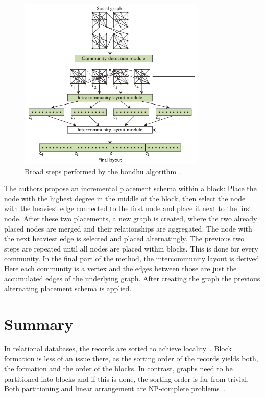     \begin{figure}[htp]
        \begin{center}
            \includegraphics[keepaspectratio,width=0.8\textwidth]{img/06-rel_w/bondhu.png}
        \end{center}
        \caption{Broad steps performed by the bondhu algorithm~\autocite{hoque2012disk}.} 
        \label{bondhu-fig}
    \end{figure}

    The authors propose an incremental placement schema within a block:
    Place the node with the highest degree in the middle of the block, then select the node with the heaviest edge connected to the first node and place it next to the first node. 
    After these two placements, a new graph is created, where the two already placed nodes are merged and their relationships are aggregated. 
    The node with the next heaviest edge is selected and placed alternatingly. The previous two steps are repeated until all nodes are placed within blocks.
    This is done for every community.
    In the final part of the method, the intercommunity layout is derived. 
    Here each community is a vertex and the edges between those are just the accumulated edges of the underlying graph. 
    After creating the graph the previous alternating placement schema is applied.
    
    
\section*{Summary}
    In relational databases, the records are sorted to achieve locality~\autocite{ramakrishnan2000database, silberschatz1997database}. 
    Block formation is less of an issue there, as the sorting order of the records yields both, the formation and the order of the blocks.
    In contrast, graphs need to be partitioned into blocks and if this is done, the sorting order is far from trivial.
    Both partitioning and linear arrangement are NP-complete problems~\autocite{lewis1983computers}.
    
